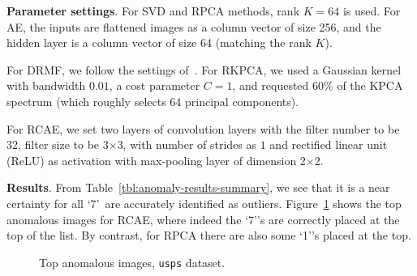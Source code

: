 \textbf{Parameter settings}.
For SVD and RPCA methods, rank $K = 64$ is used.
For AE, the inputs are flattened images as a column vector of size 256,
and the hidden layer is a column vector of size  64 (matching the rank $K$).

For DRMF, we follow the settings of~\cite{xu2010robust}.
For RKPCA, we used a Gaussian kernel with bandwidth $0.01$, a cost parameter $C = 1$, and requested $60\%$ of the KPCA spectrum (which roughly selects 64 principal components).

For RCAE, we set two layers of convolution layers with the filter number to be 32, filter size to be 3$\times$3, with number of strides as $1$ and  rectified linear unit (ReLU) as activation with max-pooling layer of dimension 2$\times$2.

\textbf{Results}.
From Table~\ref{tbl:anomaly-results-summary}, we see that it is a near certainty for all \lq7\rq\, are accurately identified as outliers.
Figure~\ref{fig:usps-anomalies} shows the top anomalous images for RCAE, where indeed the \lq7\rq's are correctly placed at the top of the list.
By contrast, for RPCA there are also some \lq1\rq's placed at the top.

\begin{figure}[!t]
	\centering
	\quad
	\caption{Top anomalous images, {\tt usps} dataset.}
	\label{fig:usps-anomalies}
\end{figure}

